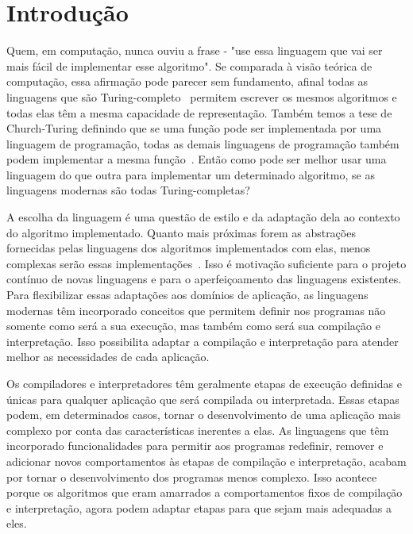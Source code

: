 \setcounter{page}{1}

\chapter*{Introdução}\label{cap:introducao}

Quem, em computação, nunca ouviu a frase - "use essa linguagem que vai ser mais fácil de implementar esse algoritmo". Se comparada à visão teórica de computação, essa afirmação pode parecer sem fundamento, afinal todas as linguagens que são Turing-completo~\cite{sipser2006introduction} permitem escrever os mesmos algoritmos e todas elas têm a mesma capacidade de representação. Também temos a tese de Church-Turing definindo que se uma função pode ser implementada por uma linguagem de programação, todas as demais linguagens de programação também podem implementar a mesma função~\cite{copeland2007church}. Então como pode ser melhor usar uma linguagem do que outra para implementar um determinado algoritmo, se as linguagens modernas são todas Turing-completas?

A escolha da linguagem é uma questão de estilo e da adaptação dela ao contexto do algoritmo implementado. Quanto mais próximas forem as abstrações fornecidas pelas linguagens dos algoritmos implementados com elas, menos complexas serão essas implementações~\cite{fowler2010domain}. Isso é motivação suficiente para o projeto contínuo de novas linguagens e para o aperfeiçoamento das linguagens existentes. Para flexibilizar essas adaptações aos domínios de aplicação, as linguagens modernas têm incorporado conceitos que permitem definir nos programas não somente como será a sua execução, mas também como será sua compilação e interpretação. Isso possibilita adaptar a compilação e interpretação para atender melhor as necessidades de cada aplicação.

Os compiladores e interpretadores têm geralmente etapas de execução definidas e únicas para qualquer aplicação que será compilada ou interpretada. Essas etapas podem, em determinados casos, tornar o desenvolvimento de uma aplicação mais complexo por conta das características inerentes a elas. As linguagens que têm incorporado funcionalidades para permitir aos programas redefinir, remover e adicionar novos comportamentos às etapas de compilação e interpretação, acabam por tornar o desenvolvimento dos programas menos complexo. Isso acontece porque os algoritmos que eram amarrados a comportamentos fixos de compilação e interpretação, agora podem adaptar etapas para que sejam mais adequadas a eles.


